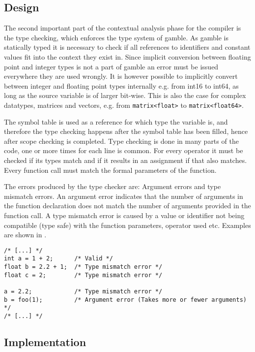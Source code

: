 \subsection*{Design}
The second important part of the contextual analysis phase for the compiler is the type checking, which enforces the type system of \gls{gamble}.
As \gls{gamble} is statically typed it is necessary to check if all references to identifiers and constant values fit into the context they exist in. 
Since implicit conversion between floating point and integer types is not a part of gamble an error must be issued everywhere they are used wrongly. 
It is however possible to implicitly convert between integer and floating point types internally e.g. from int16 to int64, as long as the source variable is of larger bit-wise.
This is also the case for complex datatypes, matrices and vectors, e.g. from \texttt{matrix<float>} to \texttt{matrix<float64>}. 

The symbol table is used as a reference for which type the variable is, and therefore the type checking happens after the symbol table has been filled, hence after scope checking is completed. 
Type checking is done in many parts of the code, one or more times for each line is common. 
For every operator it must be checked if its types match and if it results in an assignment if that also matches.
Every function call must match the formal parameters of the function. 

The errors produced by the type checker are: Argument errors and type mismatch errors.
An argument error indicates that the number of arguments in the function declaration does not match the number of arguments provided in the function call.
A type mismatch error is caused by a value or identifier not being compatible (type safe) with the function parameters, operator used etc.
Examples are shown in .

\begin{lstlisting}[caption=Examples of type errors in \gls{gamble},numbers=none,frame=tlrb,label={lst:typeErrors}]
/* [...] */
int a = 1 + 2;      /* Valid */
float b = 2.2 + 1;  /* Type mismatch error */
float c = 2;        /* Type mismatch error */

a = 2.2;            /* Type mismatch error */
b = foo(1);         /* Argument error (Takes more or fewer arguments) */ 
/* [...] */
\end{lstlisting}

\subsection*{Implementation}

